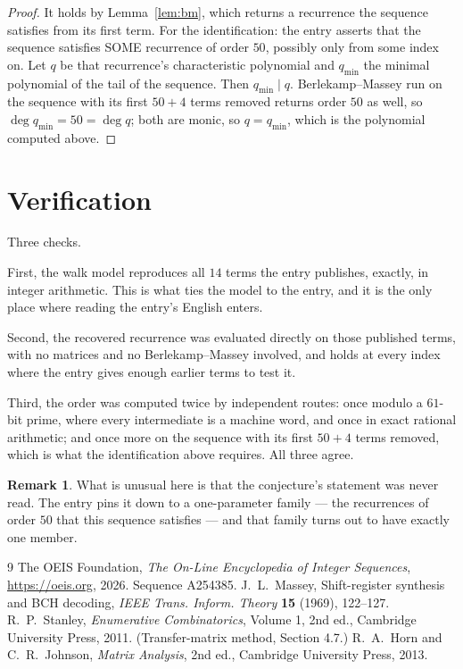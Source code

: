 \documentclass[11pt,a4paper]{article}
\theoremstyle{plain}
\theoremstyle{definition}
\newtheorem{remark}[theorem]{Remark}
\begin{document}
\begin{proof}
It holds by Lemma~\ref{lem:bm}, which returns a recurrence the sequence satisfies from its
first term. For the identification: the entry asserts that the sequence satisfies SOME
recurrence of order $50$, possibly only from some index on. Let $q$ be that recurrence's
characteristic polynomial and $q_{\min}$ the minimal polynomial of the tail of the sequence.
Then $q_{\min}\mid q$. Berlekamp--Massey run on the sequence with its first $50+4$ terms
removed returns order $50$ as well, so $\deg q_{\min}=50=\deg q$; both are monic, so
$q=q_{\min}$, which is the polynomial computed above.
\end{proof}

\section{Verification}

Three checks.

First, the walk model reproduces all $14$ terms the entry publishes, exactly, in integer
arithmetic. This is what ties the model to the entry, and it is the only place where reading
the entry's English enters.

Second, the recovered recurrence was evaluated directly on those published terms, with no
matrices and no Berlekamp--Massey involved, and holds at every index where the entry gives
enough earlier terms to test it.

Third, the order was computed twice by independent routes: once modulo a $61$-bit prime, where
every intermediate is a machine word, and once in exact rational arithmetic; and once more on
the sequence with its first $50+4$ terms removed, which is what the identification above
requires. All three agree.

\begin{remark}
What is unusual here is that the conjecture's statement was never read. The entry pins it down
to a one-parameter family --- the recurrences of order $50$ that this sequence satisfies
--- and that family turns out to have exactly one member.
\end{remark}

\begin{thebibliography}{9}
 The OEIS Foundation, \emph{The On-Line Encyclopedia of Integer
Sequences}, \url{https://oeis.org}, 2026. Sequence A254385.
 J.~L.~Massey, Shift-register synthesis and BCH decoding, \emph{IEEE
Trans. Inform. Theory} \textbf{15} (1969), 122--127.
 R.~P.~Stanley, \emph{Enumerative Combinatorics}, Volume 1, 2nd ed.,
Cambridge University Press, 2011. (Transfer-matrix method, Section 4.7.)
 R.~A.~Horn and C.~R.~Johnson, \emph{Matrix Analysis}, 2nd ed., Cambridge
University Press, 2013.
\end{thebibliography}
\end{document}
